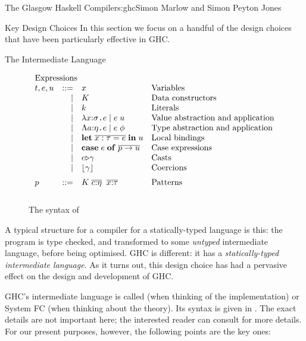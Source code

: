 \begin{aosachapter}{The Glasgow Haskell Compiler}{s:ghc}{Simon Marlow and Simon Peyton Jones}
\begin{aosasect1}{Key Design Choices}
In this section we focus on a handful of the design choices that have
been particularly effective in GHC.

\begin{aosasect2}{The Intermediate Language}
\label{s:core}

\begin{figure}[h!]
$$
\begin{array}{lrll}
\multicolumn{3}{l}{\text{Expressions}} \\
t,e,u & ::= & x  & \text{Variables} \\
      & \mid & K & \text{Data constructors} \\ 
      & \mid & k & \text{Literals} \\
      & \mid & \lambda x{:}\sigma \code{.} e \mid e\;u 
             & \text{Value abstraction and application} \\ 
    & \mid   &  \Lambda a{:}\eta \code{.} e \mid e\;\phi
             & \text{Type abstraction and application} \\ 
    & \mid    & \mathbf{let}\;\ol{x:\tau = e}\;\mathbf{in}\;u 
             & \text{Local bindings} \\ 
    & \mid    & \tcase{e}{p \to u} 
             & \text{Case expressions} \\ 
    & \mid    & \tcast{e}{\gamma}         &  \text{Casts} \\
    & \mid    & \clift{\gamma}            &  \text{Coercions} \\[2mm] 
 p  & ::=     & K\; \ol{c{:}\eta}\;\;\ol{x{:}\tau} & \text{Patterns} \\[3mm]
\end{array} 
$$
\caption{The syntax of }
\label{fig.ghc.coresyntax}
\end{figure}

A typical structure for a compiler for a statically-typed language is
this: the program is type checked, and transformed to some
\emph{untyped} intermediate language, before being optimised.  GHC is
different: it has a \emph{statically-typed intermediate language}.  As
it turns out, this design choice has had a pervasive effect on the
design and development of GHC.

GHC's intermediate language is called  (when thinking of the
implementation) or System FC (when thinking about the theory).  Its
syntax is given in .  The exact details
are not important here; the interested reader can consult
\cite{bib:system-f} for more details.  For our present purposes,
however, the following points are the key ones:


\end{aosasect2}
\end{aosasect1}
\end{aosachapter}
